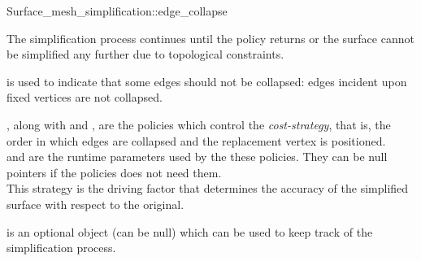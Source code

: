 \begin{ccRefFunction}{Surface_mesh_simplification::edge_collapse}

The simplification process continues until the  policy returns 
or the surface cannot be simplified any further due to topological constraints.

 is used to indicate that some edges should not be
collapsed: edges incident upon fixed vertices are not collapsed.

, along with  and ,
are the policies which control the {\em cost-strategy}, that is, 
the order in which edges are collapsed and the replacement vertex is positioned.\\
 and  are the runtime 
parameters used by the these policies. They can be null pointers
if the policies does not need them.\\
This strategy is the driving factor that determines the accuracy of the
simplified surface with respect to the original.

 is an optional object (can be null) which can be used
to keep track of the simplification process.

\end{ccRefFunction}



